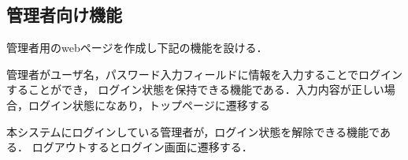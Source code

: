 \documentclass[a4paper, titlepage]{jsarticle}
\begin{document}
\subsection{管理者向け機能}
管理者用のwebページを作成し下記の機能を設ける．
\begin{description}[labelwidth=\linewidth]
  \setlength{\leftskip}{1em}
  \item [ログイン機能] 管理者がユーザ名，パスワード入力フィールドに情報を入力することでログインすることができ，
  ログイン状態を保持できる機能である．入力内容が正しい場合，ログイン状態になあり，トップページに遷移する
  \item [ログアウト機能] 本システムにログインしている管理者が，ログイン状態を解除できる機能である．
  ログアウトするとログイン画面に遷移する．


\end{description}
\end{document}
